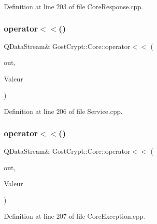 Definition at line 203 of file Core\+Response.\+cpp.

\mbox{\label{namespace_gost_crypt_1_1_core_a227fb49df0127608b27dda9d27c37d93}} 
\subsubsection{\texorpdfstring{operator$<$$<$()}{operator<<()}\hspace{0.1cm}{\footnotesize\ttfamily [38/56]}}
{\footnotesize\ttfamily Q\+Data\+Stream\& Gost\+Crypt\+::\+Core\+::operator$<$$<$ (\begin{DoxyParamCaption}\item[{Q\+Data\+Stream \&}]{out,  }\item[{const \hyperlink{class_gost_crypt_1_1_core_1_1_unknow_request}{Gost\+Crypt\+::\+Core\+::\+Unknow\+Request} \&}]{Valeur }\end{DoxyParamCaption})}



Definition at line 206 of file Service.\+cpp.

\mbox{\label{namespace_gost_crypt_1_1_core_a05f0e1b0d760173d42fee455b4377d28}} 
\subsubsection{\texorpdfstring{operator$<$$<$()}{operator<<()}\hspace{0.1cm}{\footnotesize\ttfamily [39/56]}}
{\footnotesize\ttfamily Q\+Data\+Stream\& Gost\+Crypt\+::\+Core\+::operator$<$$<$ (\begin{DoxyParamCaption}\item[{Q\+Data\+Stream \&}]{out,  }\item[{const \hyperlink{class_gost_crypt_1_1_core_1_1_format_process_failed}{Gost\+Crypt\+::\+Core\+::\+Format\+Process\+Failed} \&}]{Valeur }\end{DoxyParamCaption})}



Definition at line 207 of file Core\+Exception.\+cpp.

